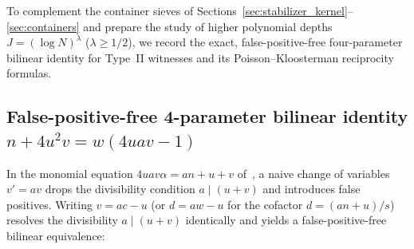 \documentclass[11pt, a4paper]{article}
\theoremstyle{plain}
\theoremstyle{definition}
\begin{document}
To complement the container sieves of Sections~\ref{sec:stabilizer_kernel}--\ref{sec:containers} and prepare the study of higher polynomial depths $J=(\log N)^{\lambda}$ ($\lambda\ge1/2$), we record the exact, false-positive-free four-parameter bilinear identity for Type~II witnesses and its Poisson--Kloosterman reciprocity formulas.

\subsection{False-positive-free 4-parameter bilinear identity $n+4u^{2}v=w(4uav-1)$}\label{subsec:exact_bilinear}

In the monomial equation $4uav\alpha=an+u+v$ of~\cite[Thm.~3.9]{dahan2026a}, a naive change of variables $v'=av$ drops the divisibility condition $a\mid(u+v)$ and introduces false positives. Writing $v=ac-u$ (or $d=aw-u$ for the cofactor $d=(an+u)/s$) resolves the divisibility $a\mid(u+v)$ identically and yields a false-positive-free bilinear equivalence:
\end{document}

